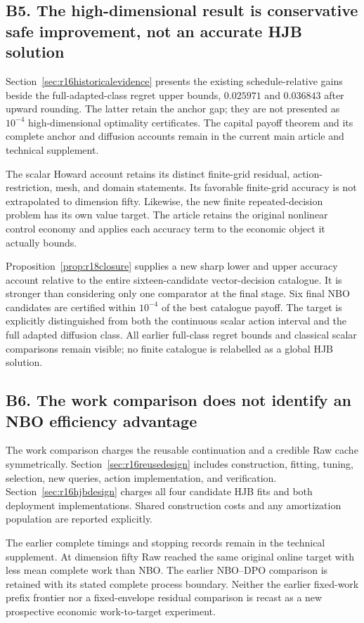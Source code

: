 \subsection*{B5. The high-dimensional result is conservative safe improvement, not an accurate HJB solution}\label{resp:B5}
Section~\ref{sec:r16historicalevidence} presents the existing schedule-relative gains beside the full-adapted-class regret upper bounds, $0.025971$ and $0.036843$ after upward rounding. The latter retain the anchor gap; they are not presented as $10^{-4}$ high-dimensional optimality certificates. The capital payoff theorem and its complete anchor and diffusion accounts remain in the current main article and technical supplement.

The scalar Howard account retains its distinct finite-grid residual, action-restriction, mesh, and domain statements. Its favorable finite-grid accuracy is not extrapolated to dimension fifty. Likewise, the new finite repeated-decision problem has its own value target. The article retains the original nonlinear control economy and applies each accuracy term to the economic object it actually bounds.


Proposition~\ref{prop:r18closure} supplies a new sharp lower and upper accuracy account relative to the entire sixteen-candidate vector-decision catalogue. It is stronger than considering only one comparator at the final stage. Six final NBO candidates are certified within $10^{-4}$ of the best catalogue payoff. The target is explicitly distinguished from both the continuous scalar action interval and the full adapted diffusion class. All earlier full-class regret bounds and classical scalar comparisons remain visible; no finite catalogue is relabelled as a global HJB solution.

\subsection*{B6. The work comparison does not identify an NBO efficiency advantage}\label{resp:B6}
The work comparison charges the reusable continuation and a credible Raw cache symmetrically. Section~\ref{sec:r16reusedesign} includes construction, fitting, tuning, selection, new queries, action implementation, and verification. Section~\ref{sec:r16hjbdesign} charges all four candidate HJB fits and both deployment implementations. Shared construction costs and any amortization population are reported explicitly.

The earlier complete timings and stopping records remain in the technical supplement. At dimension fifty Raw reached the same original online target with less mean complete work than NBO. The earlier NBO--DPO comparison is retained with its stated complete process boundary. Neither the earlier fixed-work prefix frontier nor a fixed-envelope residual comparison is recast as a new prospective economic work-to-target experiment.


